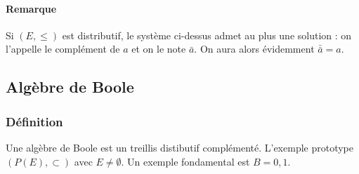 \documentclass[11pt]{article}
\begin{document}
        \paragraph{Remarque} Si $(E,\leq)$ est distributif, le système ci-dessus admet au plus une solution : on l'appelle le complément de $a$ et on le note $\bar{a}$. On aura alors évidemment $\bar{\bar{a}}=a$.

    \subsection{Algèbre de Boole}
        \subsubsection{Définition}
            Une algèbre de Boole est un treillis distibutif complémenté. L'exemple prototype $(P(E),\subset)$ avec $E\neq\emptyset$. Un exemple fondamental est $B={0,1}$.
\end{document}
